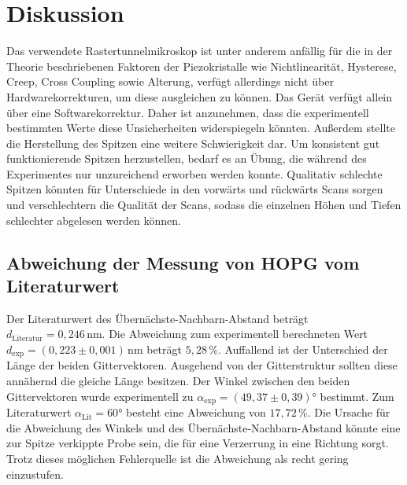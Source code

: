 \section{Diskussion}
\label{sec:Diskussion}
Das verwendete Rastertunnelmikroskop ist unter anderem anfällig für die in der Theorie beschriebenen Faktoren der Piezokristalle wie Nichtlinearität, Hysterese, Creep, Cross Coupling sowie Alterung, verfügt allerdings nicht über Hardwarekorrekturen, um diese ausgleichen zu können. Das Gerät verfügt allein über eine Softwarekorrektur. Daher ist anzunehmen, dass die experimentell bestimmten Werte diese Unsicherheiten widerspiegeln könnten. Außerdem stellte die Herstellung des Spitzen eine weitere Schwierigkeit dar. Um konsistent gut funktionierende Spitzen herzustellen, bedarf es an Übung, die während des Experimentes nur unzureichend erworben werden konnte. Qualitativ schlechte Spitzen könnten für Unterschiede in den vorwärts und rückwärts Scans sorgen und verschlechtern die Qualität der Scans, sodass die einzelnen Höhen und Tiefen schlechter abgelesen werden können. 

\subsection{Abweichung der Messung von HOPG vom Literaturwert}
Der Literaturwert des Übernächste-Nachbarn-Abstand beträgt $d_{\text{Literatur}} = 0,246 \, \unit{\nano\meter}$. Die Abweichung zum experimentell berechneten Wert $d_{\text{exp}} = (0,223 \pm 0,001)  \, \unit{\nano\meter}$ beträgt $5,28 \, \%$. Auffallend ist der Unterschied der Länge der beiden Gittervektoren. Ausgehend von der Gitterstruktur sollten diese annähernd die gleiche Länge besitzen. Der Winkel zwischen den beiden Gittervektoren wurde experimentell zu $\alpha_{\text{exp}} = (49,37 \pm 0,39)°$ bestimmt. Zum Literaturwert $\alpha_{\text{Lit}} = 60°$ besteht eine Abweichung von $17,72 \, \%$. Die Ursache für die Abweichung des Winkels und des Übernächste-Nachbarn-Abstand könnte eine zur Spitze verkippte Probe sein, die für eine Verzerrung in eine Richtung sorgt. Trotz dieses möglichen Fehlerquelle ist die Abweichung als recht gering einzustufen. 

